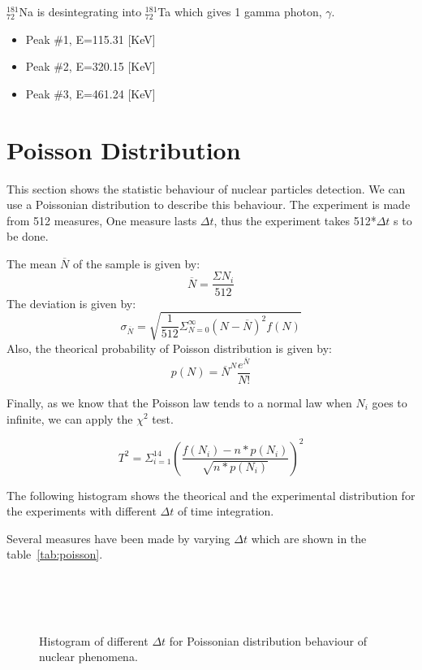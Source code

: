 \documentclass[a4paper,12pt,oneside]{article}
\begin{document}
$_{72}^{181}$Na is desintegrating into $_{72}^{181}$Ta which gives 1 gamma photon, $\gamma$.

\begin{itemize}
\item Peak \#1, E=115.31 [KeV]
\item Peak \#2, E=320.15 [KeV]
\item Peak \#3, E=461.24 [KeV]
\end{itemize}

\newpage
\section{Poisson Distribution}

This section shows the statistic behaviour of nuclear particles detection. We can use a Poissonian distribution to describe this behaviour.
The experiment is made from 512 measures, One measure lasts $\Delta t$, thus the experiment takes 512*$\Delta t$ s to be done.

The mean $\overline{N}$ of the sample is given by: $$\overline{N}=\frac{\Sigma N_i}{512}$$
The deviation is given by: $$\sigma_{\overline{N}}=\sqrt{\frac{1}{512}\Sigma^{\infty}_{N=0} (N-\overline{N})^2 f(N)}$$
Also, the theorical probability of Poisson distribution is given by: $$p(N)=\overline{N}^N \frac{e^{\overline{N}}}{N!}$$

Finally, as we know that the Poisson law tends to a normal law when $N_i$ goes to infinite, we can apply the $\chi^2$ test.

$$T^2=\Sigma^{14}_{i=1}{\left(\frac{f(N_i)-n*p(N_i)}{\sqrt{n*p(N_i)}}\right)^2}$$

The following histogram shows the theorical and the experimental distribution for the experiments with different $\Delta t$ of time integration.

Several measures have been made by varying $\Delta t$ which are shown in the table~\ref{tab:poisson}.

\begin{figure}[h!]
	\centering

	\\
	\\
	\\
	\label{figur}\caption{Histogram of different $\Delta t$ for Poissonian distribution behaviour of nuclear phenomena.}
\end{figure}
\end{document}
